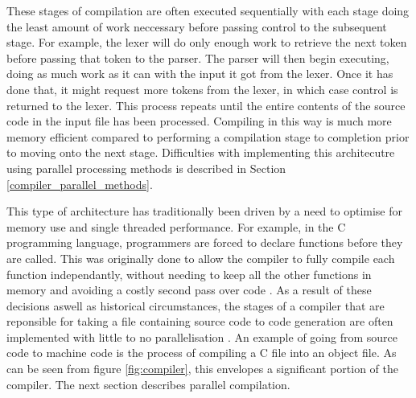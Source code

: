 These stages of compilation are often executed sequentially with each stage
doing the least amount of work neccessary before passing control to the
subsequent stage. For example, the lexer will do only enough work to retrieve
the next token before passing that token to the parser. The parser will then
begin executing, doing as much work as it can with the input it got from the
lexer. Once it has done that, it might request more tokens from the lexer,
in which case control is returned to the lexer. This process repeats until
the entire contents of the source code in the input file has been processed.
Compiling in this way is much more memory efficient compared to performing
a compilation stage to completion prior to moving onto the next stage.
Difficulties with implementing this architecutre using parallel processing
methods is described in Section \ref{compiler_parallel_methods}.

This type of architecture has traditionally been driven by a need to
optimise for memory use and single threaded performance. For example, in
the C programming language, programmers are forced to declare functions
before they are called. This was originally done to allow the compiler
to fully compile each function independantly, without needing to keep all
the other functions in memory and avoiding a costly second pass over code
\cite{scott_programming_2015}. As a result of these decisions aswell as
historical circumstances, the stages of a compiler that are reponsible  for
taking a file containing source code to code generation are often implemented
with little to no parallelisation . An example of going from source code to
machine code is the process of compiling a C file into an object file. As can be
seen from figure \ref{fig:compiler}, this envelopes a significant portion of the
compiler. The next section describes parallel compilation.

